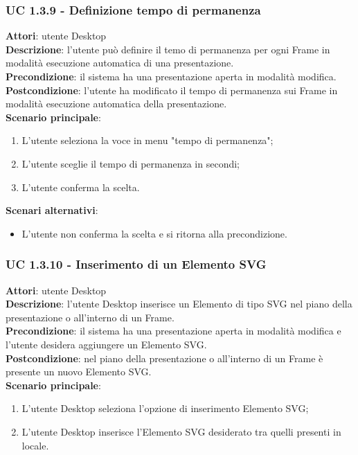 \subsubsection{UC 1.3.9 - Definizione tempo di permanenza}{
	\label{uc1.3.9}
	\textbf{Attori}: utente Desktop \\
	\textbf{Descrizione}: l'utente può definire il temo di permanenza per ogni Frame in modalità esecuzione automatica di una presentazione. \\
	\textbf{Precondizione}: il sistema ha una presentazione aperta in modalità modifica.	\\
	\textbf{Postcondizione}: l'utente ha modificato il tempo di permanenza sui Frame in modalità esecuzione automatica della presentazione.	\\
	\textbf{Scenario principale}:
	\begin{enumerate}
		\item L'utente seleziona la voce in menu "tempo di permanenza";
		\item L'utente sceglie il tempo di permanenza in secondi;
		\item L'utente conferma la scelta.
	\end{enumerate}
	\textbf{Scenari alternativi}:
	\begin{itemize}
		\item L'utente non conferma la scelta  e si ritorna alla precondizione.
	\end{itemize}
}
\subsubsection{UC 1.3.10 - Inserimento di un Elemento SVG}{
	\label{uc1.3.10}
	\textbf{Attori}: utente Desktop \\
	\textbf{Descrizione}: l'utente Desktop inserisce un Elemento di tipo SVG nel piano della presentazione o all'interno di un Frame. \\
	\textbf{Precondizione}: il sistema ha una presentazione aperta in modalità modifica e l'utente desidera aggiungere un Elemento SVG.	\\
	\textbf{Postcondizione}: nel piano della presentazione o all'interno di un Frame è presente un nuovo Elemento SVG.	\\
	\textbf{Scenario principale}:
	\begin{enumerate}
		\item L'utente Desktop seleziona l'opzione di inserimento Elemento SVG;
		\item L'utente Desktop inserisce l'Elemento SVG desiderato tra quelli presenti in locale.
	\end{enumerate}
	}
